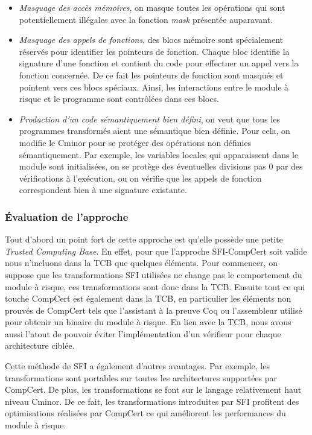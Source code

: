 \documentclass[11pt]{sdm}
\begin{document}
\begin{itemize}
	\item \textit{Masquage des accès mémoires}, on masque toutes les opérations qui sont potentiellement illégales avec la fonction \textit{mask} présentée auparavant.
	
	\item \textit{Masquage des appels de fonctions}, des blocs mémoire sont spécialement réservés pour identifier les pointeurs de fonction. Chaque bloc identifie la signature d'une fonction et contient du code pour effectuer un appel vers la fonction concernée. De ce fait les pointeurs de fonction sont masqués et pointent vers ces blocs spéciaux. Ainsi, les interactions entre le module à risque et le programme sont contrôlées dans ces blocs.

	\item \textit{Production d'un code sémantiquement bien défini}, on veut que tous les programmes transformés aient une sémantique bien définie. Pour cela, on modifie le Cminor pour se protéger des opérations non définies sémantiquement. Par exemple, les variables locales qui apparaissent dans le module sont initialisées, on se protège des éventuelles divisions pas 0 par des vérifications à l'exécution, ou on vérifie que les appels de fonction correspondent bien à une signature existante. 
	
\end{itemize}

\subsubsection{\'Evaluation de l'approche}

Tout d'abord un point fort de cette approche est qu'elle possède une petite \textit{Trusted Computing Base}. En effet, pour que l'approche SFI-CompCert soit valide nous n'incluons dans la TCB que quelques éléments. Pour commencer, on suppose que les transformations SFI utilisées ne change pas le comportement du module à risque, ces transformations sont donc dans la TCB. Ensuite tout ce qui touche CompCert est également dans la TCB, en particulier les éléments non prouvés de CompCert tels que l'assistant à la preuve Coq ou l'assembleur utilisé pour obtenir un binaire du module à risque. En lien avec la TCB, nous avons aussi l'atout de pouvoir éviter l'implémentation d'un vérifieur pour chaque architecture ciblée.

Cette méthode de SFI a également d'autres avantages. Par exemple, les transformations sont portables sur toutes les architectures supportées par CompCert. De plus, les transformations se font sur le langage relativement haut niveau Cminor. De ce fait, les transformations introduites par SFI profitent des optimisations réalisées par CompCert ce qui améliorent les performances du module à risque.
\end{document}
